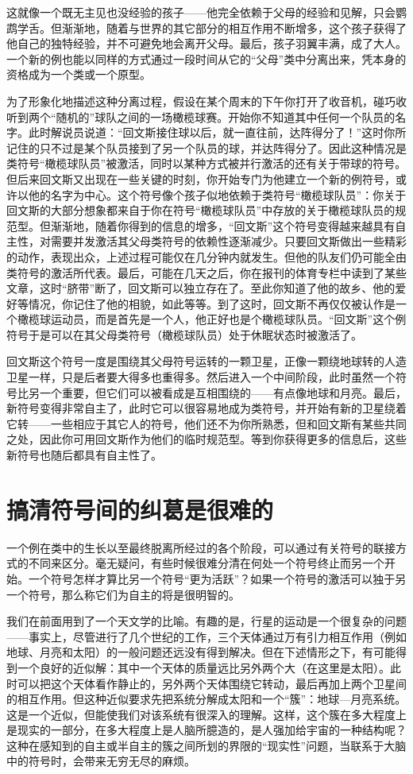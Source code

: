 这就像一个既无主见也没经验的孩子——他完全依赖于父母的经验和见解，只会鹦鹉学舌。但渐渐地，随着与世界的其它部分的相互作用不断增多，这个孩子获得了他自己的独特经验，并不可避免地会离开父母。最后，孩子羽翼丰满，成了大人。一个新的例也能以同样的方式通过一段时间从它的“父母”类中分离出来，凭本身的资格成为一个类或一个原型。

为了形象化地描述这种分离过程，假设在某个周末的下午你打开了收音机，碰巧收听到两个“随机的”球队之间的一场橄榄球赛。开始你不知道其中任何一个队员的名字。此时解说员说道：“回文斯接住球以后，就一直往前，达阵得分了！”这时你所记住的只不过是某个队员接到了另一个队员的球，并达阵得分了。因此这种情况是类符号“橄榄球队员”被激活，同时以某种方式被并行激活的还有关于带球的符号。但后来回文斯又出现在一些关键的时刻，你开始专门为他建立一个新的例符号，或许以他的名字为中心。这个符号像个孩子似地依赖于类符号“橄榄球队员”：你关于回文斯的大部分想象都来自于你在符号“橄榄球队员”中存放的关于橄榄球队员的规范型。但渐渐地，随着你得到的信息的增多，“回文斯”这个符号变得越来越具有自主性，对需要并发激活其父母类符号的依赖性逐渐减少。只要回文斯做出一些精彩的动作，表现出众，上述过程可能仅在几分钟内就发生。但他的队友们仍可能全由类符号的激活所代表。最后，可能在几天之后，你在报刊的体育专栏中读到了某些文章，这时“脐带”断了，回文斯可以独立存在了。至此你知道了他的故乡、他的爱好等情况，你记住了他的相貌，如此等等。到了这时，回文斯不再仅仅被认作是一个橄榄球运动员，而是首先是一个人，他正好也是个橄榄球队员。“回文斯”这个例符号于是可以在其父母类符号（橄榄球队员）处于休眠状态时被激活了。

回文斯这个符号一度是围绕其父母符号运转的一颗卫星，正像一颗绕地球转的人造卫星一样，只是后者要大得多也重得多。然后进入一个中间阶段，此时虽然一个符号比另一个重要，但它们可以被看成是互相围绕的——有点像地球和月亮。最后，新符号变得非常自主了，此时它可以很容易地成为类符号，并开始有新的卫星绕着它转——一些相应于其它人的符号，他们还不为你所熟悉，但和回文斯有某些共同之处，因此你可用回文斯作为他们的临时规范型。等到你获得更多的信息后，这些新符号也随后都具有自主性了。

\section{搞清符号间的纠葛是很难的}

一个例在类中的生长以至最终脱离所经过的各个阶段，可以通过有关符号的联接方式的不同来区分。毫无疑问，有些时候很难分清在何处一个符号终止而另一个开始。一个符号怎样才算比另一个符号“更为活跃”？如果一个符号的激活可以独于另一个符号，那么称它们为自主的将是很明智的。

我们在前面用到了一个天文学的比喻。有趣的是，行星的运动是一个很复杂的问题——事实上，尽管进行了几个世纪的工作，三个天体通过万有引力相互作用（例如地球、月亮和太阳）的一般问题还远没有得到解决。但在下述情形之下，有可能得到一个良好的近似解：其中一个天体的质量远比另外两个大（在这里是太阳）。此时可以把这个天体看作静止的，另外两个天体围绕它转动，最后再加上两个卫星间的相互作用。但这种近似要求先把系统分解成太阳和一个“簇”：地球—月亮系统。这是一个近似，但能使我们对该系统有很深入的理解。这样，这个簇在多大程度上是现实的一部分，在多大程度上是人脑所臆造的，是人强加给宇宙的一种结构呢？这种在感知到的自主或半自主的簇之间所划的界限的“现实性”问题，当联系于大脑中的符号时，会带来无穷无尽的麻烦。

